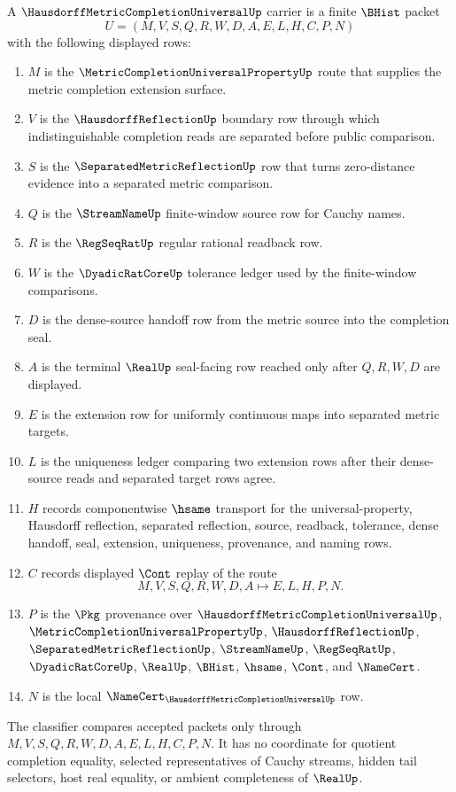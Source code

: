 \begin{definition}
\label{def:hausdorff-metric-completion-universal-carrier}
A $\HausdorffMetricCompletionUniversalUp$ carrier is a finite $\BHist$ packet
$$
U=(M,V,S,Q,R,W,D,A,E,L,H,C,P,N)
$$
with the following displayed rows:
\begin{enumerate}
\item $M$ is the $\MetricCompletionUniversalPropertyUp$ route that supplies the metric completion extension surface.
\item $V$ is the $\HausdorffReflectionUp$ boundary row through which indistinguishable completion reads are separated before public comparison.
\item $S$ is the $\SeparatedMetricReflectionUp$ row that turns zero-distance evidence into a separated metric comparison.
\item $Q$ is the $\StreamNameUp$ finite-window source row for Cauchy names.
\item $R$ is the $\RegSeqRatUp$ regular rational readback row.
\item $W$ is the $\DyadicRatCoreUp$ tolerance ledger used by the finite-window comparisons.
\item $D$ is the dense-source handoff row from the metric source into the completion seal.
\item $A$ is the terminal $\RealUp$ seal-facing row reached only after $Q,R,W,D$ are displayed.
\item $E$ is the extension row for uniformly continuous maps into separated metric targets.
\item $L$ is the uniqueness ledger comparing two extension rows after their dense-source reads and separated target rows agree.
\item $H$ records componentwise $\hsame$ transport for the universal-property, Hausdorff reflection, separated reflection, source, readback, tolerance, dense handoff, seal, extension, uniqueness, provenance, and naming rows.
\item $C$ records displayed $\Cont$ replay of the route
$$
M,V,S,Q,R,W,D,A \longmapsto E,L,H,P,N .
$$
\item $P$ is the $\Pkg$ provenance over $\HausdorffMetricCompletionUniversalUp$, $\MetricCompletionUniversalPropertyUp$, $\HausdorffReflectionUp$, $\SeparatedMetricReflectionUp$, $\StreamNameUp$, $\RegSeqRatUp$, $\DyadicRatCoreUp$, $\RealUp$, $\BHist$, $\hsame$, $\Cont$, and $\NameCert$.
\item $N$ is the local $\NameCert_{\HausdorffMetricCompletionUniversalUp}$ row.
\end{enumerate}
The classifier compares accepted packets only through $M,V,S,Q,R,W,D,A,E,L,H,C,P,N$. It has no coordinate for quotient completion equality, selected representatives of Cauchy streams, hidden tail selectors, host real equality, or ambient completeness of $\RealUp$.
\end{definition}

